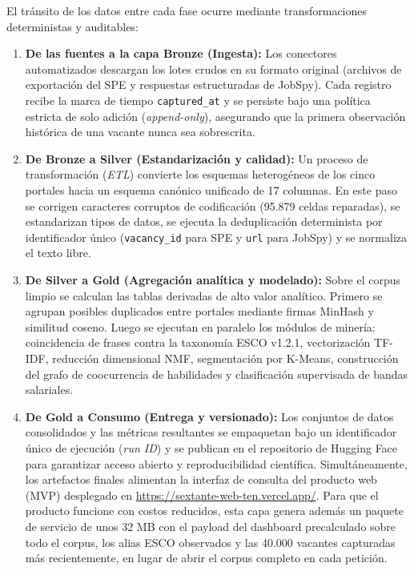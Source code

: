 \documentclass[journal]{IEEEtran}
\begin{document}
El tránsito de los datos entre cada fase ocurre mediante transformaciones deterministas y auditables:
\begin{enumerate}
\setlength{\itemsep}{2pt}
\item \textbf{De las fuentes a la capa Bronze (Ingesta):} Los conectores automatizados descargan los lotes crudos en su formato original (archivos de exportación del SPE y respuestas estructuradas de JobSpy). Cada registro recibe la marca de tiempo \texttt{captured\_at} y se persiste bajo una política estricta de solo adición (\textit{append-only}), asegurando que la primera observación histórica de una vacante nunca sea sobrescrita.
\item \textbf{De Bronze a Silver (Estandarización y calidad):} Un proceso de transformación (\textit{ETL}) convierte los esquemas heterogéneos de los cinco portales hacia un esquema canónico unificado de 17 columnas. En este paso se corrigen caracteres corruptos de codificación (95.879 celdas reparadas), se estandarizan tipos de datos, se ejecuta la deduplicación determinista por identificador único (\texttt{vacancy\_id} para SPE y \texttt{url} para JobSpy) y se normaliza el texto libre.
\item \textbf{De Silver a Gold (Agregación analítica y modelado):} Sobre el corpus limpio se calculan las tablas derivadas de alto valor analítico. Primero se agrupan posibles duplicados entre portales mediante firmas MinHash y similitud coseno. Luego se ejecutan en paralelo los módulos de minería: coincidencia de frases contra la taxonomía ESCO v1.2.1, vectorización TF-IDF, reducción dimensional NMF, segmentación por K-Means, construcción del grafo de coocurrencia de habilidades y clasificación supervisada de bandas salariales.
\item \textbf{De Gold a Consumo (Entrega y versionado):} Los conjuntos de datos consolidados y las métricas resultantes se empaquetan bajo un identificador único de ejecución (\textit{run ID}) y se publican en el repositorio de Hugging Face para garantizar acceso abierto y reproducibilidad científica. Simultáneamente, los artefactos finales alimentan la interfaz de consulta del producto web (MVP) desplegado en \url{https://sextante-web-ten.vercel.app/}. Para que el producto funcione con costos reducidos, esta capa genera además un paquete de servicio de unos 32 MB con el payload del dashboard precalculado sobre todo el corpus, los alias ESCO observados y las 40.000 vacantes capturadas más recientemente, en lugar de abrir el corpus completo en cada petición.
\end{enumerate}
\end{document}
